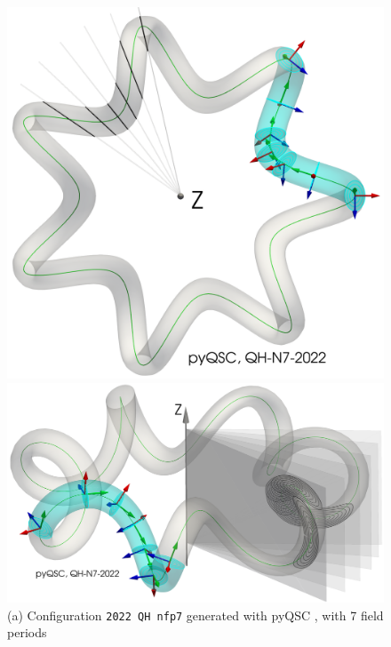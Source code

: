 \documentclass[12pt]{iopart}
\begin{document}
\begin{figure}[htbp!]
    \centering
    \includegraphics[trim=0 0 0 0,clip,height=0.2\textheight]{pics/qi_nae_N7-QH_visu3D_compare_topview.png}
    \includegraphics[trim=0 0 0 0,clip,height=0.2\textheight]{pics/qi_nae_N7-QH_visu3D_compare_sideview.png}\\[1ex]
    (a) Configuration \texttt{\small 2022 QH nfp7}  generated with pyQSC \cite{landreman-sengupta,landreman-sengupta-plunk}, with 7 field periods \\[2ex]

\end{figure}
\end{document}
